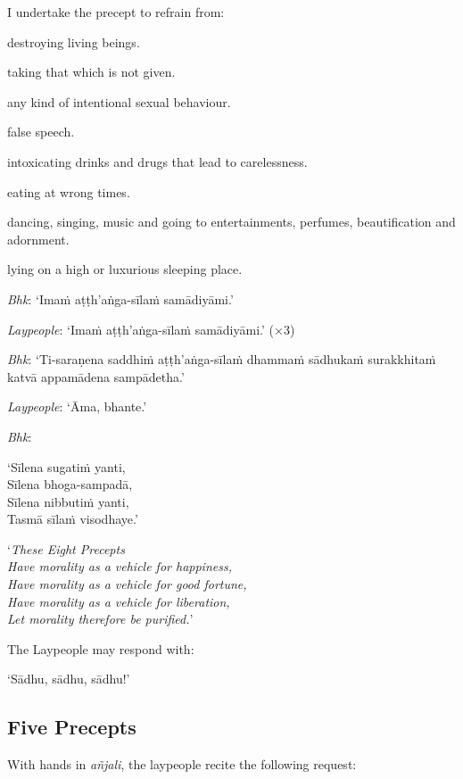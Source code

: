 
I undertake the precept to refrain from:

\begin{packeditemize}

\item destroying living beings.
\item taking that which is not given.
\item any kind of intentional sexual behaviour.
\item false speech.
\item intoxicating drinks and drugs that lead to carelessness.
\item eating at wrong times.
\item dancing, singing, music and going to entertainments, perfumes, beautification and adornment.
\item lying on a high or luxurious sleeping place.

\end{packeditemize}

\emph{Bhk}: ‘Imaṁ aṭṭh'aṅga-sīlaṁ samādiyāmi.’

\emph{Laypeople}: ‘Imaṁ aṭṭh'aṅga-sīlaṁ samādiyāmi.’ (×3)

\emph{Bhk}: ‘Ti-saraṇena saddhiṁ aṭṭh'aṅga-sīlaṁ dhammaṁ sādhukaṁ surakkhitaṁ
katvā appamādena sampādetha.’

\emph{Laypeople}: ‘Āma, bhante.’

\emph{Bhk}:

‘Sīlena sugatiṁ yanti,\\
Sīlena bhoga-sampadā,\\
Sīlena nibbutiṁ yanti,\\
Tasmā sīlaṁ visodhaye.’

‘\emph{These Eight Precepts\\
  Have morality as a vehicle for happiness,\\
  Have morality as a vehicle for good fortune,\\
  Have morality as a vehicle for liberation,\\
  Let morality therefore be purified.}’

The Laypeople may respond with:

‘Sādhu, sādhu, sādhu!’

\subsection{Five Precepts}

With hands in \emph{añjali}, the laypeople recite the following request:

